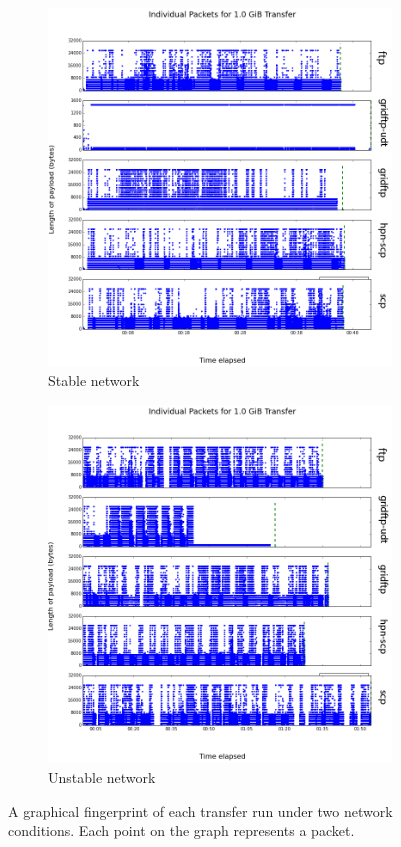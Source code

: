 \documentclass{sig-alternate-05-2015}
\begin{document}
\begin{figure}[t]
\centering
	\begin{subfigure}{.4\linewidth}
	\includegraphics[width=\linewidth]{img/packets/good.png}
	\caption{Stable network}
	\label{fig:good_transfer}
	\end{subfigure}
	\begin{subfigure}{.4\linewidth}
	\includegraphics[width=\linewidth]{img/packets/bad.png}
	\caption{Unstable network}
	\label{fig:bad_transfer}
	\end{subfigure}
\caption{A graphical fingerprint of each transfer run under two network conditions. Each point on the graph represents a packet.}
\label{fig:packets}
\end{figure}
\end{document}

